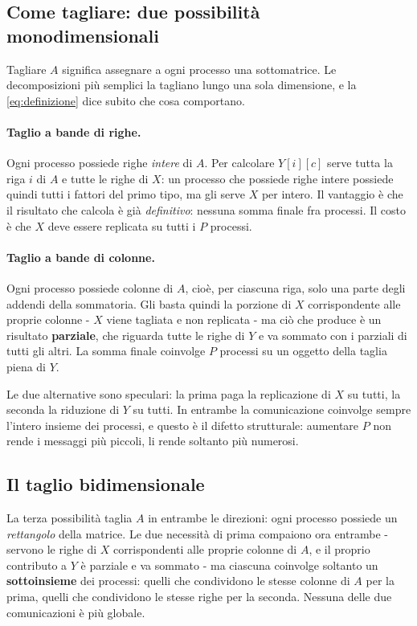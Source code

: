\subsection{Come tagliare: due possibilità monodimensionali}

Tagliare $A$ significa assegnare a ogni processo una sottomatrice. Le
decomposizioni più semplici la tagliano lungo una sola dimensione, e la
\cref{eq:definizione} dice subito che cosa comportano.

\paragraph{Taglio a bande di righe.} Ogni processo possiede righe \emph{intere}
di $A$. Per calcolare $Y[i][c]$ serve tutta la riga $i$ di $A$ e tutte le
righe di $X$: un processo che possiede righe intere possiede quindi tutti i
fattori del primo tipo, ma gli serve $X$ per intero. Il vantaggio è che il
risultato che calcola è già \emph{definitivo}: nessuna somma finale fra
processi. Il costo è che $X$ deve essere replicata su tutti i $P$ processi.

\paragraph{Taglio a bande di colonne.} Ogni processo possiede colonne di $A$,
cioè, per ciascuna riga, solo una parte degli addendi della sommatoria. Gli
basta quindi la porzione di $X$ corrispondente alle proprie colonne - $X$
viene tagliata e non replicata - ma ciò che produce è un risultato
\textbf{parziale}, che riguarda tutte le righe di $Y$ e va sommato con i
parziali di tutti gli altri. La somma finale coinvolge $P$ processi su un
oggetto della taglia piena di $Y$.

\medskip

Le due alternative sono speculari: la prima paga la replicazione di $X$ su
tutti, la seconda la riduzione di $Y$ su tutti. In entrambe la comunicazione
coinvolge sempre l'intero insieme dei processi, e questo è il difetto
strutturale: aumentare $P$ non rende i messaggi più piccoli, li rende soltanto
più numerosi.

\subsection{Il taglio bidimensionale}

La terza possibilità taglia $A$ in entrambe le direzioni: ogni processo
possiede un \emph{rettangolo} della matrice. Le due necessità di prima
compaiono ora entrambe - servono le righe di $X$ corrispondenti alle proprie
colonne di $A$, e il proprio contributo a $Y$ è parziale e va sommato - ma
ciascuna coinvolge soltanto un \textbf{sottoinsieme} dei processi: quelli che
condividono le stesse colonne di $A$ per la prima, quelli che condividono le
stesse righe per la seconda. Nessuna delle due comunicazioni è più globale.

